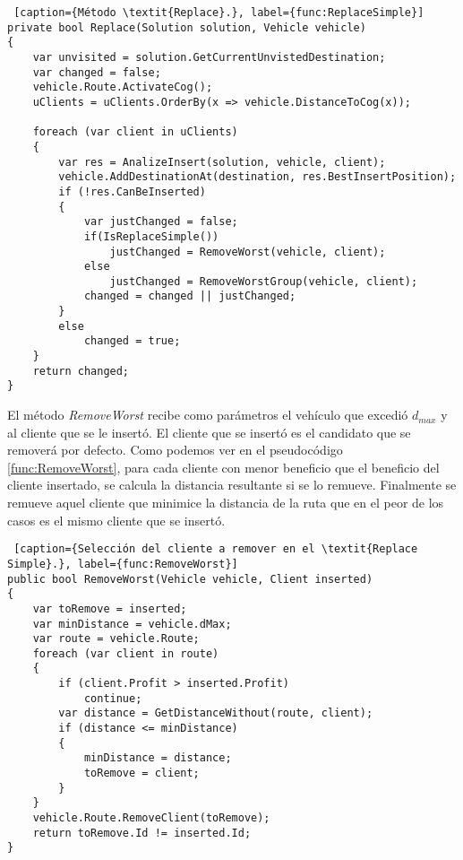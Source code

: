 \bigskip

\begin{minipage}{\textwidth}
\begin{lstlisting} [caption={Método \textit{Replace}.}, label={func:ReplaceSimple}]
private bool Replace(Solution solution, Vehicle vehicle)
{
	var unvisited = solution.GetCurrentUnvistedDestination;
	var changed = false;
	vehicle.Route.ActivateCog();
	uClients = uClients.OrderBy(x => vehicle.DistanceToCog(x));	

	foreach (var client in uClients)
	{
		var res = AnalizeInsert(solution, vehicle, client);
		vehicle.AddDestinationAt(destination, res.BestInsertPosition);
		if (!res.CanBeInserted)
		{
			var justChanged = false;
			if(IsReplaceSimple())
				justChanged = RemoveWorst(vehicle, client);
			else
				justChanged = RemoveWorstGroup(vehicle, client);
			changed = changed || justChanged;
		}
		else
			changed = true;
	}
	return changed;
}
\end{lstlisting}
\end{minipage}

\bigskip

El método \textit{RemoveWorst} recibe como parámetros el vehículo que excedió $d_{max}$ y al cliente que se le insertó. El cliente que se insertó es el candidato que se removerá por defecto. Como podemos ver en el pseudocódigo \ref{func:RemoveWorst}, para cada cliente con menor beneficio que el beneficio del cliente insertado, se calcula la distancia resultante si se lo remueve. Finalmente se remueve aquel cliente que minimice la distancia de la ruta que en el peor de los casos es el mismo cliente que se insertó.

\bigskip

\begin{minipage}{\textwidth}
\begin{lstlisting} [caption={Selección del cliente a remover en el \textit{Replace Simple}.}, label={func:RemoveWorst}]
public bool RemoveWorst(Vehicle vehicle, Client inserted)
{
	var toRemove = inserted;
	var minDistance = vehicle.dMax;
	var route = vehicle.Route;
	foreach (var client in route)
	{
		if (client.Profit > inserted.Profit)
			continue;
		var distance = GetDistanceWithout(route, client);
		if (distance <= minDistance)
		{
			minDistance = distance;
			toRemove = client;
		}
	}
	vehicle.Route.RemoveClient(toRemove);
	return toRemove.Id != inserted.Id;
}
\end{lstlisting}
\end{minipage}

\bigskip

